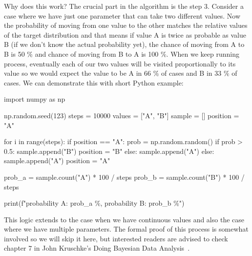 \documentclass[12pt,a4paper,leqno]{report}
\theoremstyle{plain}
\theoremstyle{definition}
\theoremstyle{remark}
\begin{document}
Why does this work? The crucial part in the algorithm is the step 3. Consider a case
where we have just one parameter that can take two different values. Now the probability
of moving from one value to the other matches the relative values of the
target distribution and that means if value A is twice as probable as value B (if we don't know the
actual probability yet), the chance of moving from A to B is 50 \% and chance of moving
from B to A is 100 \%. When we keep running process, eventually each of our two values
will be visited proportionally to its value so we would expect the value to be A in 66
\% of cases and B in 33 \% of cases. We can demonstrate this with short Python
example:

\begin{pyblock}[][fontsize=\footnotesize]
import numpy as np

np.random.seed(123)
steps = 10000
values = ["A", "B"]
sample = []
position = "A"

for i in range(steps):
    if position == "A":
        prob = np.random.random()
        if prob > 0.5:
            sample.append("B")
            position = "B"
        else:
            sample.append("A")
    else:
        sample.append("A")
        position = "A"

prob_a = sample.count("A") * 100 / steps
prob_b = sample.count("B") * 100 / steps

print(f"probability A: {prob_a} \%, probability B: {prob_b} \%")
\end{pyblock}
\stdoutpythontex
\bigskip

This logic extends to the case when we have
continuous values and also the case where we have multiple parameters. The formal proof
of this process is somewhat involved so we will skip it here, but interested readers are
advised to check chapter 7 in John Kruschke's Doing Bayesian Data Analysis\ \cite{kruschke}.
\end{document}
